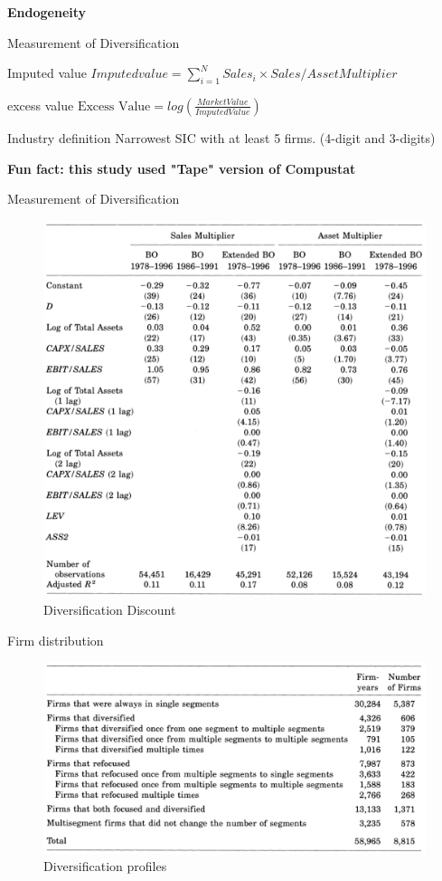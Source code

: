 \documentclass[aspectratio=169,xcolor=dvipsnames]{beamer}
\begin{document}
\begin{frame}
    \Huge{\centerline{\textbf{Endogeneity}}}
\end{frame}

\begin{frame}{Measurement of Diversification}
    \begin{block}{Imputed value}
        $Imputed value = \sum_{i=1}^{N} Sales_i \times Sales/Asset Multiplier$
    \end{block}
    \begin{block}{excess value}
        $\text{Excess Value} = log(\frac{Market Value}{Imputed Value})$
    \end{block}
    \begin{block}{Industry definition}
        Narrowest SIC with at least 5 firms. (4-digit and 3-digits)
    \end{block}
\end{frame}

\begin{frame}
    \Large{\centerline{\textbf{Fun fact: this study used "Tape" version of Compustat}}}
\end{frame}


\begin{frame}{Measurement of Diversification}
    \begin{figure}
        \includegraphics[width=0.5\linewidth]{figures/table1.png}
        \caption{Diversification Discount}
    \end{figure}
\end{frame}

\begin{frame}{Firm distribution}
    \begin{figure}
        \includegraphics[width=0.8\linewidth]{figures/table2.png}
        \caption{Diversification profiles}
    \end{figure}
\end{frame}
\end{document}
